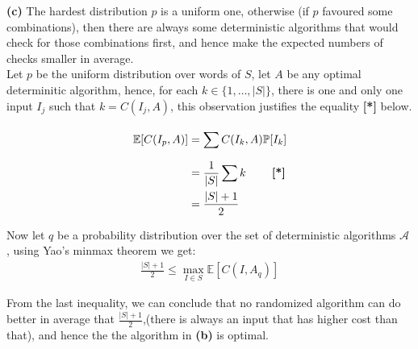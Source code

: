 \documentclass{article}
\def\P{\mathbb{P}}
\def\E{\mathbb{E}}
\begin{document}
\noindent

\textbf{(c)} The hardest distribution $p$ is a uniform one, otherwise (if $p$ favoured some combinations), then there are always some deterministic algorithms that would check for those combinations first, and hence make the expected numbers of checks smaller in average. \\

Let $p$ be the uniform distribution over words of $S$, let $A$ be any optimal determinitic algorithm, hence, for each $k \in \{1, \dots, |S|\}$, there is one and only one input $I_j$ such that $k = C(I_j, A)$, this observation justifies the equality \textbf{[*]} below.

\begin{align*}
    \E[C(I_p, A)] &= \sum_{}^{} C(I_k, A) \P[I_k] \\
                  &= \frac{1}{|S|} \sum k  \textbf{\quad \quad [*]}\\
                  &= \frac{|S|+1}{2} \\
\end{align*}


Now let $q$ be a probability distribution over the set of deterministic algorithms $\mathcal{A}$ , using Yao's minmax theorem we get:
\begin{align*}
   \frac{|S|+1}{2}  \leq  \max_{I \in S} \E[C(I, A_q)]
\end{align*}

From the last inequality, we can conclude that no randomized algorithm can do better in average that $\frac{|S|+1}{2}$,(there is always an input that has higher cost than that), and hence the the algorithm in \textbf{(b)} is optimal.
\end{document}
